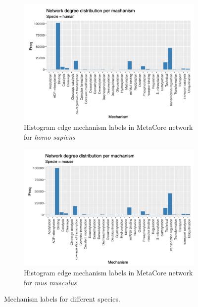 \begin{figure}[!htbp]
    \begin{subfigure}{0.5\linewidth}
        \includegraphics[width=\textwidth, height=\textheight, keepaspectratio]{Major Thesis/figures/eda/Degree_human.png}
            \caption{Histogram edge mechanism labels in MetaCore network for \textit{homo sapiens}}
    \end{subfigure}
    \hfill
    \begin{subfigure}{0.5\linewidth}
        \includegraphics[width=\textwidth, height=\textheight, keepaspectratio]{Major Thesis/figures/eda/Degree_mice.png}
            \caption{Histogram edge mechanism labels in MetaCore network for \textit{mus musculus}}
    \end{subfigure}
    \caption{Mechanism labels for different species.}
    \label{img:suppl:degrees}
\end{figure}

